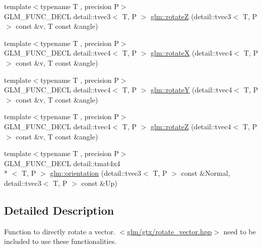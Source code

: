 \begin{DoxyCompactItemize}
\item 
{\footnotesize template$<$typename T , precision P$>$ }\\G\-L\-M\-\_\-\-F\-U\-N\-C\-\_\-\-D\-E\-C\-L detail\-::tvec3$<$ T, P $>$ \hyperlink{group__gtx__rotate__vector_gae5c27548f86f1e95f76a87cf16f512da}{glm\-::rotate\-Z} (detail\-::tvec3$<$ T, P $>$ const \&v, T const \&angle)
\item 
{\footnotesize template$<$typename T , precision P$>$ }\\G\-L\-M\-\_\-\-F\-U\-N\-C\-\_\-\-D\-E\-C\-L detail\-::tvec4$<$ T, P $>$ \hyperlink{group__gtx__rotate__vector_gaa0db2d8b73f86d7bfdf2bface4056e88}{glm\-::rotate\-X} (detail\-::tvec4$<$ T, P $>$ const \&v, T const \&angle)
\item 
{\footnotesize template$<$typename T , precision P$>$ }\\G\-L\-M\-\_\-\-F\-U\-N\-C\-\_\-\-D\-E\-C\-L detail\-::tvec4$<$ T, P $>$ \hyperlink{group__gtx__rotate__vector_gae48a26ac0e3670ad2486858bf2a8e90b}{glm\-::rotate\-Y} (detail\-::tvec4$<$ T, P $>$ const \&v, T const \&angle)
\item 
{\footnotesize template$<$typename T , precision P$>$ }\\G\-L\-M\-\_\-\-F\-U\-N\-C\-\_\-\-D\-E\-C\-L detail\-::tvec4$<$ T, P $>$ \hyperlink{group__gtx__rotate__vector_ga1db5137be16ed5d375038e06707ac52b}{glm\-::rotate\-Z} (detail\-::tvec4$<$ T, P $>$ const \&v, T const \&angle)
\item 
{\footnotesize template$<$typename T , precision P$>$ }\\G\-L\-M\-\_\-\-F\-U\-N\-C\-\_\-\-D\-E\-C\-L detail\-::tmat4x4\\*
$<$ T, P $>$ \hyperlink{group__gtx__rotate__vector_gac80aaf3b2af70c7f03f1077d4b6ac507}{glm\-::orientation} (detail\-::tvec3$<$ T, P $>$ const \&Normal, detail\-::tvec3$<$ T, P $>$ const \&Up)
\end{DoxyCompactItemize}


\subsection{Detailed Description}
Function to directly rotate a vector. $<$\hyperlink{rotate__vector_8hpp}{glm/gtx/rotate\-\_\-vector.\-hpp}$>$ need to be included to use these functionalities. 

